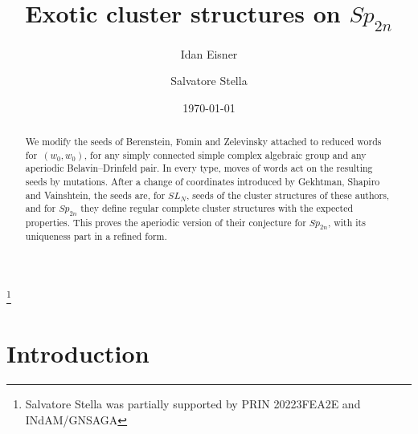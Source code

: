 \documentclass[a4paper]{amsart}
\numberwithin{equation}{section}
\theoremstyle{definition}
\theoremstyle{remark}
\begin{document}
\title{Exotic cluster structures on $Sp_{2n}$} \author{Idan Eisner} \address{Department of Computer Science, Tel-Hai University of the Galilee, Kiryat Shmona, Israel}  \author{Salvatore Stella} \address{Universit\`a degli Studi dell'Aquila, Dipartimento di Ingegneria e Scienze dell'Informazione e Matematica, Via Vetoio, 67100 L'Aquila, Italy}  \thanks{Salvatore Stella was partially supported by PRIN 20223FEA2E and INdAM/GNSAGA} \date{\today}

\begin{abstract}
  We modify the seeds of Berenstein, Fomin and Zelevinsky attached to reduced words for~$(w_0,w_0)$, for any simply connected simple complex algebraic group and any aperiodic Belavin--Drinfeld pair.
  In every type, moves of words act on the resulting seeds by mutations.
  After a change of coordinates introduced by Gekhtman, Shapiro and Vainshtein, the seeds are, for $SL_N$, seeds of the cluster structures of these authors, and for $Sp_{2n}$ they define regular complete cluster structures with the expected properties.
  This proves the aperiodic version of their conjecture for $Sp_{2n}$, with its uniqueness part in a refined form.
\end{abstract}
\maketitle

\section{Introduction}
\label{sec: intro}
\end{document}
